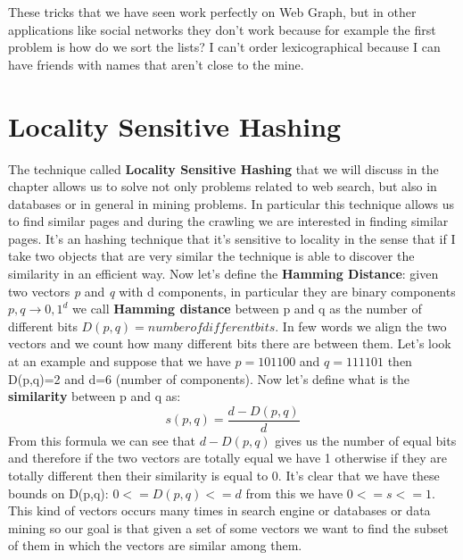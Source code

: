 These tricks that we have seen work perfectly on Web Graph, but in other applications like social networks they don't work because for example the first problem is how do we sort the lists? I can't order lexicographical because I can have friends with names that aren't close to the mine.
\chapter{Locality Sensitive Hashing}
The technique called \textbf{Locality Sensitive Hashing} that we will discuss in the chapter allows us to solve not only problems related to web search, but also in databases or in general in mining problems. In particular this technique allows us to find similar pages and during the crawling we are interested in finding similar pages.\newline
It's an hashing technique that it's sensitive to locality in the sense that if I take two objects that are very similar the technique is able to discover the similarity in an efficient way.\newline
Now let's define the \textbf{Hamming Distance}: given two vectors \textit{p} and \textit{q} with d components, in particular they are binary components $p,q \to {0,1}^d$ we call  \textbf{Hamming distance} between p and q as the number of different bits $D(p,q)=number of different bits$. In few words we align the two vectors and we count how many different bits there are between them.\newline
Let's look at an example and suppose that we have $p=101100$ and $q=111101$ then D(p,q)=2 and d=6 (number of components).\newline
Now let's define what is the \textbf{similarity} between p and q as: 
\begin{equation}
    s(p,q) = \frac{d-D(p,q)}{d}
\end{equation}
From this formula we can see that $d-D(p,q)$ gives us the number of equal bits and therefore if the two vectors are totally equal we have 1 otherwise if they are totally different then their similarity is equal to 0.\newline
It's clear that we have these bounds on D(p,q): $0 <= D(p,q) <= d$ from this we have $0 <= s <= 1$.\newline
This kind of vectors occurs many times in search engine or databases or data mining so our goal is that given a set of some vectors we want to find the subset of them in which the vectors are similar among them.\newline
